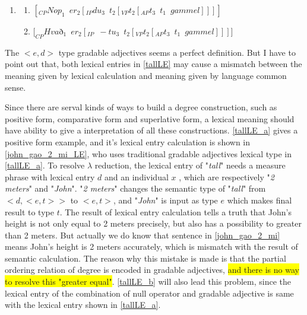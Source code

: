 \documentclass{ctexart}
\begin{document}
\begin{enumerate}[resume]
    \item \label{Icelandic_example_LE}
    
    \begin{enumerate}[ref=(\arabic{enumi}\alph*)]
        \item $[_{CP}Nop_1 \enspace er_2[_{IP}du_3 \enspace t_2[_{VP} t_2[_{AP} t_3 \enspace t_1 \enspace gammel]]]]$
        
        \item $[_{CP}Hva$ð$_1 \enspace er_2[_{IP} \enspace -tu_3 \enspace t_2 [_{VP}t_2[_{AP}t_3 \enspace t_1 \enspace gammel]]]]$
        
    \end{enumerate}   
    
\end{enumerate}

The $<e,d>$ type gradable adjectives seems a perfect definition. But I have to point out that, both lexical entries in \ref{tallLE} may cause a mismatch between the meaning given by lexical calculation and meaning given by language common sense. 

Since there are serval kinds of ways to build a degree construction, such as positive form, comparative form and superlative form, a lexical meaning should have ability to give a interpretation of all these constructions. \ref{tallLE_a} gives a positive form example, and it's lexical entry calculation is shown in \ref{john_gao_2_mi_LE}, who uses traditional gradable adjectives lexical type in \ref{tallLE_a}. To resolve $\lambda$ reduction, the lexical entry of "\textit{tall}" needs a measure phrase with lexical entry $d$ and an individual $x$ , which are respectively "\textit{2 meters}" and "\textit{John}". "\textit{2 meters}" changes the semantic type of "\textit{tall}" from $<d,<e,t>>$ to $<e,t>$, and "\textit{John}" is input as type $e$ which makes final result to type $t$. The result of lexical entry calculation tells a truth that John's height is not only equal to 2 meters precisely, but also has a possibility to greater than 2 meters. But actually we do know that sentence in \ref{john_gao_2_mi} means John's height is 2 meters accurately, which is mismatch with the result of semantic calculation. The reason why this mistake is made is that the partial ordering relation of degree is encoded in gradable adjectives, \colorbox{yellow}{and there is no way to resolve this "greater equal"}. \ref{tallLE_b} will also lead this problem, since the lexical entry of the combination of null operator and gradable adjective is same with the lexical entry shown in \ref{tallLE_a}.
\end{document}

